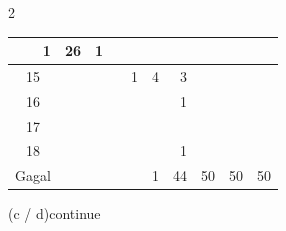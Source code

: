 \documentclass[12pt]{article}
\begin{document}
{\begin{multicols}{2}
{\begin{tabular}{|c|lllllllll|}
\multicolumn{1}{r|}{1} & \multicolumn{1}{r|}{26} & \multicolumn{1}{r|}{1} & \multicolumn{1}{r|}{} & \multicolumn{1}{r|}{} & \\ \hline 15 & \multicolumn{1}{r|}{} & \multicolumn{1}{r|}{} & \multicolumn{1}{r|}{} & \multicolumn{1}{r|}{1} & \multicolumn{1}{r|}{4} & \multicolumn{1}{r|}{3} & \multicolumn{1}{r|}{} & \multicolumn{1}{r|}{} & \\ \hline 16 & \multicolumn{1}{r|}{} & \multicolumn{1}{r|}{} & \multicolumn{1}{r|}{} & \multicolumn{1}{r|}{} & \multicolumn{1}{r|}{} & \multicolumn{1}{r|}{1} & \multicolumn{1}{r|}{} & \multicolumn{1}{r|}{} & \\ \hline 17 & \multicolumn{1}{r|}{} & \multicolumn{1}{r|}{} & \multicolumn{1}{r|}{} & \multicolumn{1}{r|}{} & \multicolumn{1}{r|}{} & \multicolumn{1}{r|}{} & \multicolumn{1}{r|}{} & \multicolumn{1}{r|}{} & \\ \hline 18 & \multicolumn{1}{r|}{} & \multicolumn{1}{r|}{} & \multicolumn{1}{r|}{} & \multicolumn{1}{r|}{} & \multicolumn{1}{r|}{} & \multicolumn{1}{r|}{1} & \multicolumn{1}{r|}{} & \multicolumn{1}{r|}{} & \\ \hline Gagal & \multicolumn{1}{r|}{} & \multicolumn{1}{r|}{} & \multicolumn{1}{r|}{} & \multicolumn{1}{r|}{} & \multicolumn{1}{r|}{1} & \multicolumn{1}{r|}{44} & \multicolumn{1}{r|}{50} & \multicolumn{1}{r|}{50} & 50 \\ \hline
		\end{tabular}
	}
	\end{multicols}
}{(c / d)}{continue}
\end{document}
